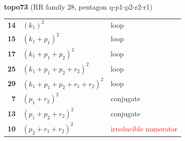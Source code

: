 \documentclass[10pt]{article}
\begin{document}
\begin{minipage}[t]{0.48\textwidth}
{}\\[2mm]\textbf{topo73} (RR family 28, pentagon q-p1-p2-r2-r1)\\[2pt]{\footnotesize\begin{tabular}{@{}r@{\ \ }l@{\ \ }l@{}}\textbf{14} & $(k_1)^2$ & loop\\
\textbf{15} & $(k_1+p_1)^2$ & loop\\
\textbf{17} & $(k_1+p_1+p_2)^2$ & loop\\
\textbf{25} & $(k_1+p_1+p_2+r_2)^2$ & loop\\
\textbf{29} & $(k_1+p_1+p_2+r_1+r_2)^2$ & loop\\
\textbf{7} & $(p_1+r_2)^2$ & conjugate\\
\textbf{13} & $(p_1+p_2+r_2)^2$ & conjugate\\
\textbf{10} & $(p_2+r_1+r_2)^2$ & \textcolor{red}{irreducible numerator}\\\end{tabular}}\end{minipage}\hfill%
\end{document}
